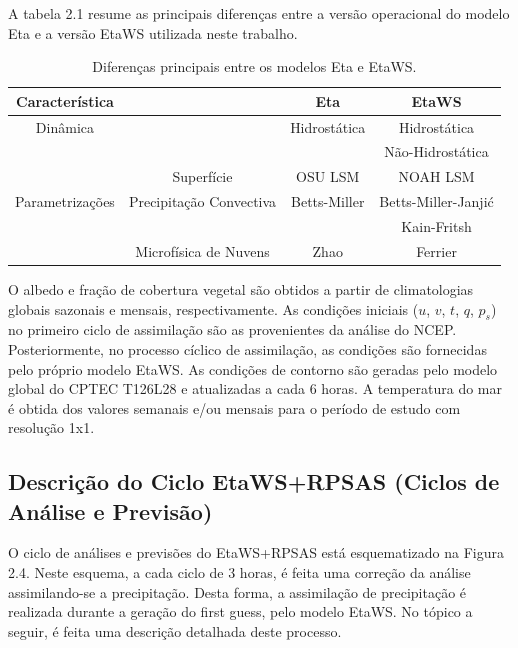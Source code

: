 A tabela 2.1 resume as principais diferenças entre a versão operacional do modelo Eta e a versão EtaWS utilizada neste trabalho.

\begin{table}[ht]
\caption{Diferenças principais entre os modelos Eta e EtaWS.}
\label{tab01}
\centering
\begin{tabular}{c|c|c|c}
\hline
Característica      &                                 & Eta               & EtaWS                    \\
\hline
Dinâmica            &                                 & Hidrostática  & Hidrostática         \\
                        &                                 &                   & Não-Hidrostática \\
                        & Superfície                  & OSU LSM           & NOAH LSM                 \\
Parametrizações & Precipitação Convectiva & Betts-Miller      & Betts-Miller-Janji\'{c}  \\
                        &                                 &                   & Kain-Fritsh              \\
                        & Microfísica de Nuvens       & Zhao              & Ferrier                  \\
\hline
\end{tabular}
\end{table}

O albedo e fração de cobertura vegetal são obtidos a partir de climatologias globais sazonais e mensais, respectivamente. As condições iniciais ($u$, $v$, $t$, $q$, $p_{s}$) no primeiro ciclo de assimilação são as provenientes da análise do NCEP. Posteriormente, no processo cíclico de assimilação, as condições são fornecidas pelo próprio modelo EtaWS. As condições de contorno são geradas pelo modelo global do CPTEC T126L28 e atualizadas a cada 6 horas. A temperatura do mar é obtida dos valores semanais e/ou mensais para o período de estudo com resolução 1x1.

\subsection{Descrição do Ciclo EtaWS+RPSAS (Ciclos de Análise e Previsão)}

O ciclo de análises e previsões do EtaWS+RPSAS está esquematizado na Figura 2.4. Neste esquema, a cada ciclo de 3 horas, é feita uma correção da análise assimilando-se a precipitação. Desta forma, a assimilação de precipitação é realizada durante a geração do first guess, pelo modelo EtaWS. No tópico a seguir, é feita uma descrição detalhada deste processo.

